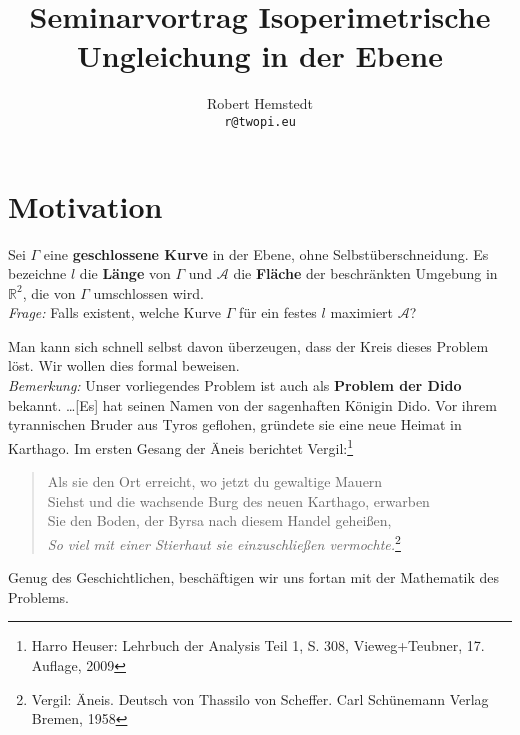 \documentclass[12pt,a4paper]{article}
\author{Robert Hemstedt \\ \texttt{r@twopi.eu}}
\title{Seminarvortrag Isoperimetrische Ungleichung in der Ebene}
\theoremstyle{plain}
\newcommand{\R}{\mathbb{R}}
\numberwithin{equation}{section}
\begin{document}
\maketitle
\section{Motivation}
Sei $\Gamma$ eine \textbf{geschlossene Kurve} in der Ebene, ohne Selbstüberschneidung. Es bezeichne $l$ die \textbf{Länge} von $\Gamma$ und $\mathcal{A}$ die \textbf{Fläche} der beschränkten Umgebung in $\R^2$, die von $\Gamma$ umschlossen wird.\\
\textit{Frage:} Falls existent, welche Kurve $\Gamma$ für ein festes $l$ maximiert $\mathcal{A}$?

Man kann sich schnell selbst davon überzeugen, dass der Kreis dieses Problem löst.
Wir wollen dies formal beweisen.\\
\emph{Bemerkung:} Unser vorliegendes Problem ist auch als \textbf{Problem der Dido} bekannt. \glqq \ldots [Es] hat seinen Namen von der sagenhaften Königin Dido. Vor ihrem tyrannischen Bruder aus Tyros geflohen, gründete sie eine neue Heimat in Karthago. Im ersten Gesang der Äneis berichtet Vergil:\grqq\footnote{Harro Heuser: Lehrbuch der Analysis Teil 1, S. 308, Vieweg+Teubner, 17. Auflage, 2009}
\begin{quote}
\noindent Als sie den Ort erreicht, wo jetzt du gewaltige Mauern \\
Siehst und die wachsende Burg des neuen Karthago, erwarben \\
Sie den Boden, der Byrsa nach diesem Handel geheißen,\\
\emph{So viel mit einer Stierhaut sie einzuschließen vermochte.}\footnote{Vergil: Äneis. Deutsch von Thassilo von Scheffer. Carl Schünemann Verlag Bremen, 1958}
\end{quote}
Genug des Geschichtlichen, beschäftigen wir uns fortan mit der Mathematik des Problems.
\end{document}
